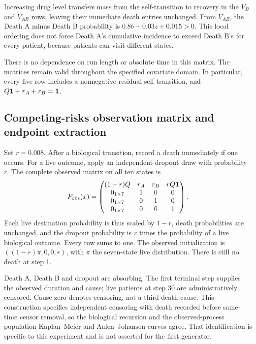 Increasing drug level transfers mass from the self-transition to recovery in the $V_B$ and $V_{AB}$ rows, leaving their immediate death entries unchanged. From $V_{AB}$, the Death A minus Death B probability is $0.8b+0.03z+0.015>0$. This local ordering does not force Death A's cumulative incidence to exceed Death B's for every patient, because patients can visit different states.

There is no dependence on run length or absolute time in this matrix. The matrices remain valid throughout the specified covariate domain. In particular, every live row includes a nonnegative residual self-transition, and $Q\mathbf 1+r_A+r_B=\mathbf 1$.

\subsection{Competing-risks observation matrix and endpoint extraction}
Set $r=0.008$. After a biological transition, record a death immediately if one occurs. For a live outcome, apply an independent dropout draw with probability $r$. The complete observed matrix on all ten states is
\begin{equation}\label{eq:observedcr}
P_{\rm obs}(x)=\begin{pmatrix}
(1-r)Q&r_A&r_B&rQ\mathbf 1\\
0_{1\times7}&1&0&0\\
0_{1\times7}&0&1&0\\
0_{1\times7}&0&0&1
\end{pmatrix}.
\end{equation}
Each live destination probability is thus scaled by $1-r$, death probabilities are unchanged, and the dropout probability is $r$ times the probability of a live biological outcome. Every row sums to one. The observed initialization is $((1-r)\pi,0,0,r)$, with $\pi$ the seven-state live distribution. There is still no death at step 1.

Death A, Death B and dropout are absorbing. The first terminal step supplies the observed duration and cause; live patients at step 30 are administratively censored. Cause zero denotes censoring, not a third death cause. This construction specifies independent censoring with death recorded before same-time censor removal, so the biological recursion and the observed-process population Kaplan--Meier and Aalen--Johansen curves agree. That identification is specific to this experiment and is not asserted for the first generator.

